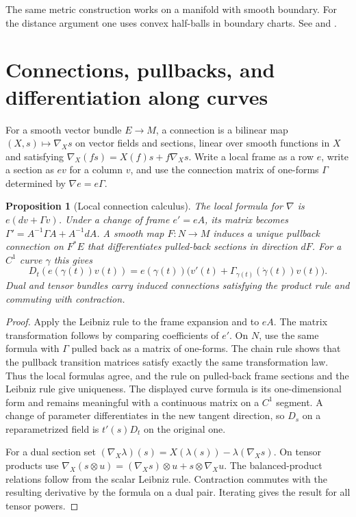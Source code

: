 \documentclass[11pt,oneside,openany]{book}
\theoremstyle{plain}
\newtheorem{proposition}[theorem]{Proposition}
\theoremstyle{definition}
\theoremstyle{remark}
\begin{document}
The same metric construction works on a manifold with smooth boundary.
For the distance argument one uses convex half-balls in boundary charts.
See \cite[Chapter 2]{LeeRM} and \cite[Chapter 1]{dC}.

\section{Connections, pullbacks, and differentiation along curves}
\label{p202:G04}

For a smooth vector bundle \(E\to M\), a connection is a bilinear
map \((X,s)\mapsto\nabla_Xs\) on vector fields and sections, linear
over smooth functions in \(X\) and satisfying
\(\nabla_X(fs)=X(f)s+f\nabla_Xs\). Write a local frame as a row \(e\),
write a section as \(e v\) for a column \(v\), and use the connection
matrix of one-forms \(\Gamma\) determined by \(\nabla e=e\Gamma\).

\begin{proposition}[Local connection calculus]
\label{prop:p202-pullback-connection}
The local formula for \(\nabla\) is \(e(dv+\Gamma v)\).
Under a change of frame \(e'=e A\), its matrix becomes
\(\Gamma'=A^{-1}\Gamma A+A^{-1}dA\).
A smooth map \(F:N\to M\) induces a unique pullback connection on
\(F^*E\) that differentiates pulled-back sections in direction \(dF\).
For a \(C^1\) curve \(\gamma\) this gives
\[
 D_t(e(\gamma(t))v(t))=
 e(\gamma(t))\bigl(v'(t)+\Gamma_{\gamma(t)}(\dot\gamma(t))v(t)\bigr).
\]
Dual and tensor bundles carry induced connections satisfying the
product rule and commuting with contraction.
\end{proposition}

\begin{proof}
Apply the Leibniz rule to the frame expansion and to \(e A\).
The matrix transformation follows by comparing coefficients of \(e'\).
On \(N\), use the same formula with \(\Gamma\) pulled back as a
matrix of one-forms. The chain rule shows that the pullback transition
matrices satisfy exactly the same transformation law. Thus the local
formulas agree, and the rule on pulled-back frame sections and the
Leibniz rule give uniqueness. The displayed curve formula is its
one-dimensional form and remains meaningful with a continuous
matrix on a \(C^1\) segment. A change of parameter differentiates in
the new tangent direction, so \(D_s\) on a reparametrized field is
\(t'(s)D_t\) on the original one.

For a dual section set
\((\nabla_X\lambda)(s)=X(\lambda(s))-\lambda(\nabla_Xs)\).
On tensor products use
\(\nabla_X(s\otimes u)=(\nabla_Xs)\otimes u+s\otimes\nabla_Xu\).
The balanced-product relations follow from the scalar Leibniz rule.
Contraction commutes with the resulting derivative by the formula
on a dual pair. Iterating gives the result for all tensor powers.
\end{proof}
\end{document}
